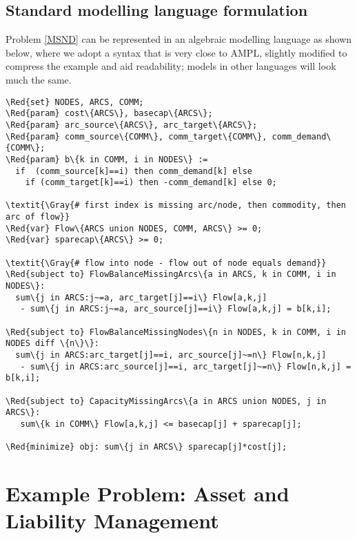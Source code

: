 \documentclass[10pt,a4paper]{book}
\begin{document}
%
%
\subsection{Standard modelling language formulation}

Problem \eqref{MSND} can be represented in an algebraic
modelling language as shown below, where we adopt a
syntax that is very close to AMPL, slightly modified to compress the example
and aid readability; models in other languages will look much the same.
%
\begin{Verbatim}[frame=single,framerule=0.2pt,framesep=5pt,commandchars=\\\{\}]
\Red{set} NODES, ARCS, COMM;
\Red{param} cost\{ARCS\}, basecap\{ARCS\};
\Red{param} arc_source\{ARCS\}, arc_target\{ARCS\};
\Red{param} comm_source\{COMM\}, comm_target\{COMM\}, comm_demand\{COMM\};
\Red{param} b\{k in COMM, i in NODES\} := 
  if  (comm_source[k]==i) then comm_demand[k] else 
    if (comm_target[k]==i) then -comm_demand[k] else 0;

\textit{\Gray{# first index is missing arc/node, then commodity, then arc of flow}}
\Red{var} Flow\{ARCS union NODES, COMM, ARCS\} >= 0;
\Red{var} sparecap\{ARCS\} >= 0;
 
\textit{\Gray{# flow into node - flow out of node equals demand}}
\Red{subject to} FlowBalanceMissingArcs\{a in ARCS, k in COMM, i in NODES\}:
  sum\{j in ARCS:j~=a, arc_target[j]==i\} Flow[a,k,j]  
   - sum\{j in ARCS:j~=a, arc_source[j]==i\} Flow[a,k,j] = b[k,i]; 

\Red{subject to} FlowBalanceMissingNodes\{n in NODES, k in COMM, i in NODES diff \{n\}\}:
  sum\{j in ARCS:arc_target[j]==i, arc_source[j]~=n\} Flow[n,k,j]  
   - sum\{j in ARCS:arc_source[j]==i, arc_target[j]~=n\} Flow[n,k,j] = b[k,i]; 

\Red{subject to} CapacityMissingArcs\{a in ARCS union NODES, j in ARCS\}:
   sum\{k in COMM\} Flow[a,k,j] <= basecap[j] + sparecap[j];

\Red{minimize} obj: sum\{j in ARCS\} sparecap[j]*cost[j];
\end{Verbatim}

\section{Example Problem: Asset and Liability Management}
\end{document}
